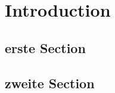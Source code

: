 \chapter{Introduction}
\label{ch:introduction}

\blindtext

\blindtext

\blindtext[5]

\section{erste Section}
\label{sec:erste-section}

\blindtext[12]

\section{zweite Section}
\label{sec:zweite-section}

\blindtext[4]